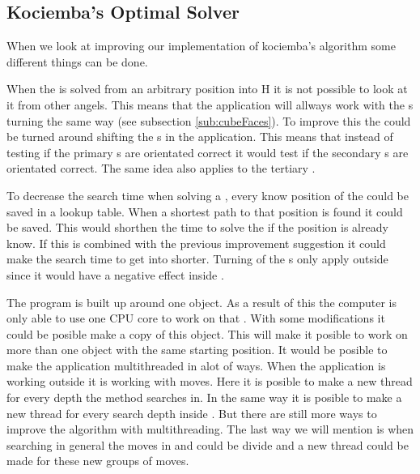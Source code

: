 \subsection{Kociemba's Optimal Solver}
When we look at improving our implementation of kociemba's algorithm some different things can be done.
	
When the \rubik{} is solved from an arbitrary position into H it is not possible to look at it from other angels. 
This means that the application will allways work with the \face{}s turning the same way (see subsection \ref{sub:cubeFaces}).
To improve this the \rubik{} could be turned around shifting the \face{}s in the application.
This means that instead of testing if the primary \face{} \cubie{}s are orientated correct it would test if the secondary \face{} \cubie{}s are orientated correct. 
The same idea also applies to the tertiary \face{}.
	
To decrease the search time when solving a \rubik{}, every know position of the \rubik{} could be saved in a lookup table.
When a shortest path to that position is found it could be saved.
This would shorthen the time to solve the \rubik{} if the position is already know.
If this is combined with the previous improvement suggestion it could make the search time to get into  shorter.
Turning of the \face{}s only apply outside  since it would have a negative effect inside . 
	 
The program is built up around one \cube{} object.
As a result of this the computer is only able to use one CPU core to work on that \cube{}.
With some modifications it could be posible make a copy of this \cube{} object.
This will make it posible to work on more than one \cube{} object with the same starting position.
It would be posible to make the application multithreaded in alot of ways.
When the application is working outside  it is working with  moves.
Here it is posible to make a new thread for every depth the method searches in.
In the same way it is posible to make a new thread for every search depth inside .
But there are still more ways to improve the algorithm with multithreading.
The last way we will mention is when searching in general the moves in  and  could be divide and a new thread could be made for these new groups of moves.